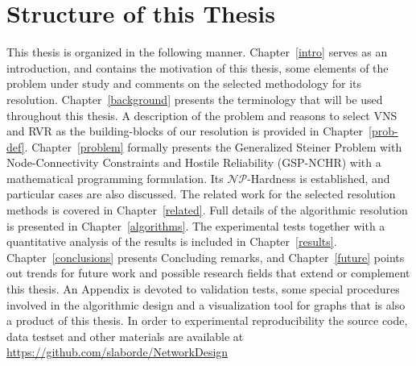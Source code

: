 \section{Structure of this Thesis}
This thesis is organized in the following manner. Chapter~\ref{intro} serves as an introduction, and contains the motivation of this thesis, some elements of the problem under study and comments on the selected methodology for its resolution. Chapter~\ref{background} presents the terminology that will be used throughout this thesis. A 
description of the problem and reasons to select VNS and RVR as the building-blocks of our resolution is provided in Chapter~\ref{prob-def}. Chapter~\ref{problem} formally presents the 
Generalized Steiner Problem with Node-Connectivity Constraints and Hostile Reliability (GSP-NCHR) 
with a mathematical programming formulation. Its $\mathcal{NP}$-Hardness is established, and particular cases are also discussed. The related work for the selected resolution methods is covered in Chapter~\ref{related}. 
Full details of the algorithmic resolution is presented in Chapter~\ref{algorithms}. The experimental tests  
together with a quantitative analysis of the results is included in Chapter~\ref{results}. 
Chapter~\ref{conclusions} presents Concluding remarks, and Chapter~\ref{future} points out trends for future work and possible research fields that extend or complement this thesis. An Appendix is devoted to validation tests, some special procedures involved in the algorithmic design and a visualization tool for graphs that is also a product of this thesis.
In order to experimental reproducibility the source code, data testset and other materials are available at \url{https://github.com/slaborde/NetworkDesign}